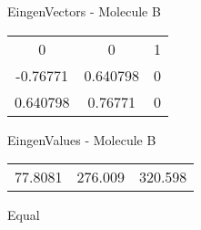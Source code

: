 \begin{multicols}{2}
\begin{center}
\vtab
 EingenVectors - Molecule B     \\
\vtab
\begin{tabular}{|c c c|}
0	 & 	0	 & 	1	 \\
-0.76771	 & 	0.640798	 & 	0	 \\
0.640798	 & 	0.76771	 & 	0
\end{tabular}

\vtab
 EingenValues - Molecule B     \\
\vtab
\begin{tabular}{|c c c|}
77.8081	 & 	276.009	 & 	320.598	 \\
\end{tabular}

\end{center}
\end{multicols}
\begin{center}
\vtab
\vtab
\textcolor{NavyBlue}{\Large Equal}
\end{center}

 \newpage

